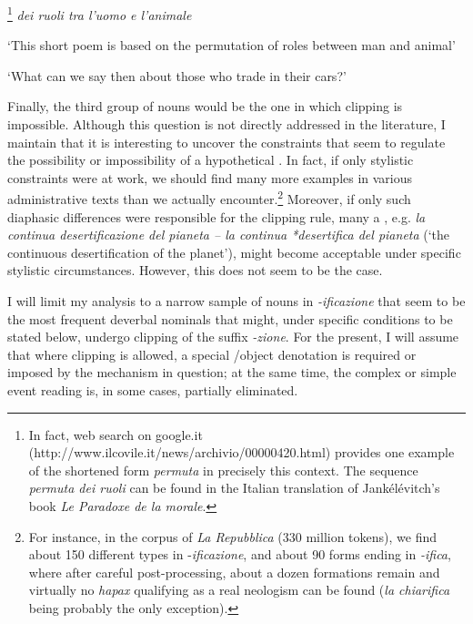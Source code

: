 \documentclass[output=paper]{langsci/langscibook}
\begin{document}
\begin{exe}
\ex\label{ex:Stekauer:9}
\begin{xlist}

\footnote{In fact,
  web search on google.it
  (http://www.ilcovile.it/news/archivio/00000420.html) provides one
  example of the shortened form \emph{permuta} in precisely this
  context. The sequence \emph{permuta dei ruoli} can be found in the
  Italian translation of Jankélévitch's book \emph{Le Paradoxe de la morale}.} \emph{dei ruoli tra l'uomo e l'animale}

\trans `This short poem is based on the permutation of  roles between 
man and  animal'



\trans `What can we say then about those who trade in their cars?'
\end{xlist}
\end{exe}
Finally, the third group of nouns would be the one in which clipping is impossible. Although this question is not directly
addressed in the literature, I maintain that it is interesting to uncover the constraints
that seem to regulate the possibility or impossibility of a hypothetical
. In fact, if only stylistic constraints
were at work, we should find many more examples in various
administrative texts than we actually encounter.\footnote{For instance,
  in the corpus of \emph{La Repubblica} (330 million tokens), we find about
  150 different types in -\emph{ificazione}, and about 90 forms ending
  in \emph{-ifica}, where after  careful post-processing,
  about a dozen  formations remain and virtually no \emph{hapax}
  qualifying as a real neologism can be found (\emph{la chiarifica}
  being probably the only exception).} Moreover, if only such diaphasic
differences were responsible for the clipping rule, many a
, e.g. \emph{la continua desertificazione del pianeta --
la continua *desertifica del pianeta} (`the continuous desertification
of the planet'), might become acceptable under specific stylistic
circumstances. However, this does not seem to be the case.

I will limit my analysis to a narrow sample of nouns in
\emph{-ificazione} that seem to be the most frequent deverbal nominals
that might, under specific conditions to be stated below, undergo 
clipping of the suffix \emph{-zione}. For the present, I will assume
that where clipping is allowed, a special /object denotation is
required or imposed by the mechanism in question; at the same time, the
complex or simple event reading is, in some cases, partially eliminated.
\end{document}
